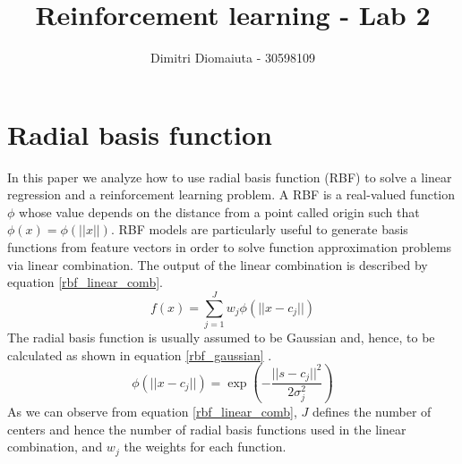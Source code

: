\documentclass[runningheads]{llncs}
\begin{document}
%
\title{Reinforcement learning - Lab 2}
%
%
\author{Dimitri Diomaiuta - 30598109}
%
%
%
\maketitle              %
%
%
%
%
\section{Radial basis function}\label{RBF}
In this paper we analyze how to use radial basis function (RBF) to
solve a linear regression and a reinforcement learning problem. A RBF
is a real-valued function $\phi$ whose value depends on the distance
from a point called origin such that $\phi(x) = \phi(||x||)$. RBF
models are particularly useful to generate basis functions from
feature vectors in order to solve function approximation problems via
linear combination. The output of the linear combination is described
by equation \ref{rbf_linear_comb}.
\begin{equation}\label{rbf_linear_comb}
  f(x) = \sum_{j=1}^{J}w_j\phi(||x-c_j||)
\end{equation}
The radial basis function is usually assumed to be Gaussian and,
hence, to be calculated as shown in equation \ref{rbf_gaussian}
\cite{rlbook}.
\begin{equation}\label{rbf_gaussian}
\phi(||x-c_j||) = \exp\left(-\frac{||s-c_j||^2}{2\sigma^2_j}\right)
\end{equation}
As we can observe from equation \ref{rbf_linear_comb}, $J$ defines the
number of centers and hence the number of radial basis functions used
in the linear combination, and $w_j$ the weights for each function.
\end{document}
